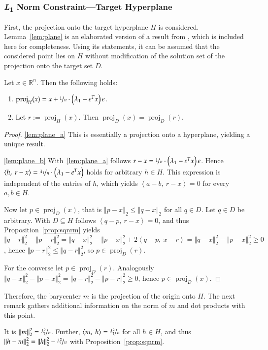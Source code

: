 \documentclass[twoside,11pt]{article}
\DeclareMathOperator{\proj}{proj}
\newcommand{\R}{\mathbb{R}}
\newcommand{\0}{\mathcal{O}}
\newcommand{\transp}{^T}
\newcommand{\norm}[1]{\left\Vert#1\right\Vert}
\newcommand{\scp}[2]{\left<#1,\ #2\right>}
\begin{document}
\subsubsection{\textit{L}\textsubscript{1} Norm Constraint---Target Hyperplane}
\label{sect:l1nrmcnstrnt}
First, the projection onto the target hyperplane $H$ is considered.
Lemma~\ref{lem:plane} is an elaborated version of a result from \cite{Theis2005}, which is included here for completeness.
Using its statements, it can be assumed that the considered point lies on $H$ without modification of the solution set of the projection onto the target set $D$.
\begin{lemma}
\label{lem:plane}
Let $x\in\R^n$.
Then the following holds:
\begin{enumerate}
\item \label{lem:plane_a}
$\proj_H(x) = x + \nicefrac{1}{n}\cdot\left(\lambda_1 - e\transp x\right)e$.

\item \label{lem:plane_b}
Let $r := \proj_H(x)$. Then $\proj_D(x) = \proj_D(r)$.
\end{enumerate}
\end{lemma}
\begin{proof}
\ref{lem:plane_a}
This is essentially a projection onto a hyperplane, yielding a unique result.

\ref{lem:plane_b}
With~\ref{lem:plane_a} follows $r - x = \nicefrac{1}{n}\cdot\left(\lambda_1 - e\transp x\right)e$.
Hence $\scp{h}{r - x} = \nicefrac{\lambda_1}{n}\cdot\left(\lambda_1 - e\transp x\right)$ holds for arbitrary $h\in H$.
This expression is independent of the entries of $h$, which yields $\scp{a - b}{r - x} = 0$ for every $a,b\in H$.

Now let $p\in\proj_D(x)$, that is $\norm{p - x}_2 \leq \norm{q - x}_2$ for all $q\in D$.
Let $q\in D$ be arbitrary.
With $D\subseteq H$ follows $\scp{q - p}{r - x} = 0$, and thus Proposition~\ref{prop:sqnrm} yields $\norm{q - r}_2^2 - \norm{p - r}_2^2 = \norm{q - x}_2^2 - \norm{p - x}_2^2 + 2\scp{q - p}{x - r} = \norm{q - x}_2^2 - \norm{p - x}_2^2 \geq 0$, hence $\norm{p - r}_2^2 \leq \norm{q - r}_2^2$, so $p\in\proj_D(r)$.

For the converse let $p\in\proj_D(r)$.
Analogously $\norm{q - x}_2^2 - \norm{p - x}_2^2 = \norm{q - r}_2^2 - \norm{p - r}_2^2 \geq 0$, hence $p\in\proj_D(x)$.
\end{proof}
Therefore, the barycenter $m$ is the projection of the origin onto $H$.
The next remark gathers additional information on the norm of $m$ and dot products with this point.
\begin{remark}
\label{rem:point_m}
It is $\norm{m}_2^2 = \nicefrac{\lambda_1^2}{n}$.
Further, $\scp{m}{h} = \nicefrac{\lambda_1^2}{n}$ for all $h\in H$, and thus $\norm{h - m}_2^2 = \norm{h}_2^2 - \nicefrac{\lambda_1^2}{n}$ with Proposition~\ref{prop:sqnrm}.
\end{remark}
\end{document}
